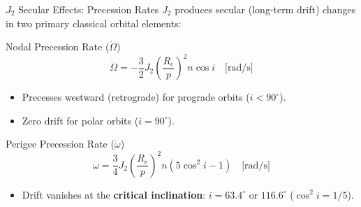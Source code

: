 \documentclass[aspectratio=169,11pt]{beamer}
\begin{document}
\begin{frame}{$J_2$ Secular Effects: Precession Rates}
    $J_2$ produces secular (long-term drift) changes in two primary classical orbital elements:

    \begin{block}{Nodal Precession Rate ($\dot{\Omega}$)}
        $$\dot{\Omega} = -\frac{3}{2} J_2 \left(\frac{R_e}{p}\right)^2 n \cos i \quad \text{[rad/s]}$$
        \begin{itemize}
            \item Precesses westward (retrograde) for prograde orbits ($i < 90^\circ$).
            \item Zero drift for polar orbits ($i = 90^\circ$).
        \end{itemize}
    \end{block}

    \begin{block}{Perigee Precession Rate ($\dot{\omega}$)}
        $$\dot{\omega} = \frac{3}{4} J_2 \left(\frac{R_e}{p}\right)^2 n \left( 5\cos^2 i - 1 \right) \quad \text{[rad/s]}$$
        \begin{itemize}
            \item Drift vanishes at the \textbf{critical inclination}: $i = 63.4^\circ$ or $116.6^\circ$ ($\cos^2 i = 1/5$).
        \end{itemize}
    \end{block}
\end{frame}
\end{document}
